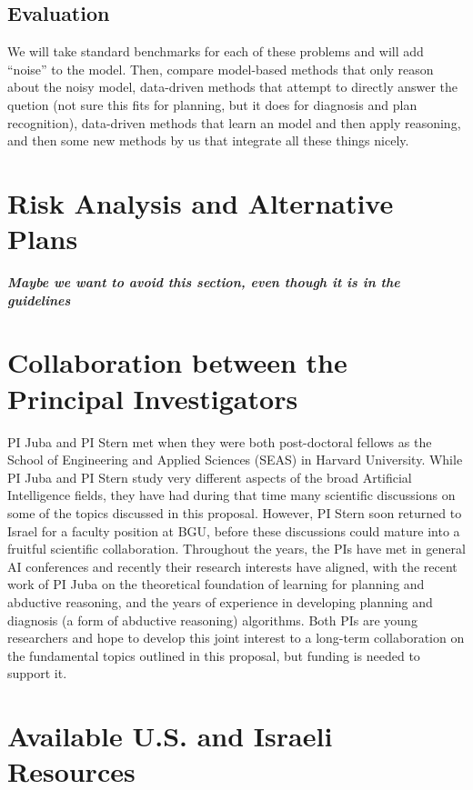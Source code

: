 \documentclass[12pt]{article}
\newcommand{\note}[1]{\textbf{\textit{#1}}}
\begin{document}
\subsection{Evaluation}

We will take standard benchmarks for each of these problems and will add ``noise'' to the model. Then, compare model-based methods that only reason about the noisy model, data-driven methods that attempt to directly answer the quetion (not sure this fits for planning, but it does for diagnosis and plan recognition), data-driven methods that learn an model and then apply reasoning, 
and then some new methods by us that integrate all these things nicely. 


\section{Risk Analysis and Alternative Plans}
\note{Maybe we want to avoid this section, even though it is in the guidelines}

\section{Collaboration between the Principal Investigators}
PI Juba and PI Stern met when they were both post-doctoral fellows as the School of Engineering and Applied Sciences (SEAS) in Harvard University. 
While PI Juba and PI Stern study very different aspects of the broad Artificial Intelligence fields, they have had during that time many scientific discussions on some of the topics discussed in this proposal. However, PI Stern soon returned to Israel for a faculty position at BGU, before these discussions could mature into a fruitful scientific collaboration. 
Throughout the years, the PIs have met in general AI conferences
and recently their research interests have aligned, 
with the recent work of PI Juba on the theoretical foundation of learning for planning and abductive reasoning, and the years of experience in developing planning and diagnosis (a form of abductive reasoning) algorithms. 
Both PIs are young researchers and hope to develop this joint interest to a long-term collaboration on the fundamental topics outlined in this proposal, but funding is needed to support it.  

\section{Available U.S. and Israeli Resources}






\pagebreak


\end{document}
